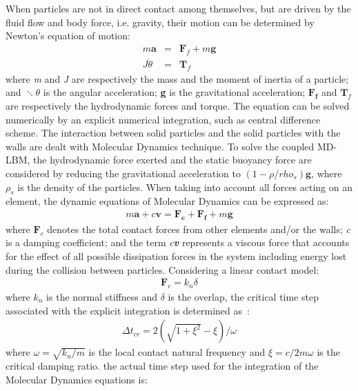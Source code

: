 When particles are not in direct contact among themselves, but are driven by the fluid flow and body force, i.e. gravity, their motion can be determined by Newton's equation of motion:
\begin{eqnarray}
\mathit{m}\mathbf{ a} & = & \mathbf{F}_{f} + \mathit{m }\mathbf{g} \\
\mathit{J } \ddot{\theta} & = &  \mathbf{T}_{f}
\end{eqnarray}
where \textit{m} and \textit{J} are respectively the mass and the moment of inertia of a particle; and $\ddots{\theta}$ is the angular acceleration; \textbf{g} is the gravitational acceleration; $\mathbf{F_f}$ and $\mathbf{T}_{f}$ are respectively the hydrodynamic forces and torque. The equation can be solved numerically by an explicit numerical integration, such as central difference scheme. The interaction between solid particles and the solid particles with the walls are dealt with Molecular Dynamics technique. To solve the coupled MD-LBM, the hydrodynamic force exerted and the static buoyancy force are considered by reducing the gravitational acceleration to $(1- \rho/rho_{s})\mathbf{g}$, where $\rho_{s}$ is the density of the particles. When taking into account all forces acting on an element, the dynamic equations of Molecular Dynamics can be expressed as:
\begin{eqnarray}
\label{eq:mde}
\mathit{m}\mathbf{a} +\mathit{c}\mathbf{v} = \mathbf{F_c} + \mathbf{F_f} +\mathit{m}\mathbf{g}
\end{eqnarray} 
where $\mathbf{F}_{c}$ denotes the total contact forces from other elements and/or the walls; \textit{c} is a damping coefficient; and the term \textit{c\textbf{v}} represents a viscous force that accounts for the effect of all possible dissipation forces in the system including energy lost during the collision between particles. Considering a linear contact model:
\begin{eqnarray}
\mathbf{F}_{c}=\mathit{k}_{\mathit{n}} \delta
\end{eqnarray}
where $\mathit{k}_{\mathit{n}}$ is the normal stiffness and $\delta$ is the overlap, the critical time step associated with the explicit integration is determined as~\citep{He1997}:
\begin{eqnarray}
\Delta t_{\mathit{cr}}= 2(\sqrt{1 + \xi^{2}}-\xi) / \omega
\end{eqnarray}
where $\omega = \sqrt{\mathit{k}_{\mathit{n}}/\mathit{m}}$ is the local contact natural frequency and $\xi = \mathit{c}/2\mathit{m}\omega$ is the critical damping ratio. the actual time step used for the integration of the Molecular Dynamics equations is:
